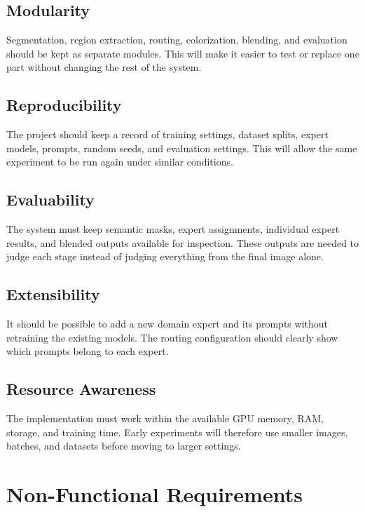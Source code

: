 \documentclass{FastFyp}
\begin{document}
\subsection{Modularity}

Segmentation, region extraction, routing, colorization, blending, and evaluation should be kept as separate modules. This will make it easier to test or replace one part without changing the rest of the system.

\subsection{Reproducibility}

The project should keep a record of training settings, dataset splits, expert models, prompts, random seeds, and evaluation settings. This will allow the same experiment to be run again under similar conditions.

\subsection{Evaluability}

The system must keep semantic masks, expert assignments, individual expert results, and blended outputs available for inspection. These outputs are needed to judge each stage instead of judging everything from the final image alone.

\subsection{Extensibility}

It should be possible to add a new domain expert and its prompts without retraining the existing models. The routing configuration should clearly show which prompts belong to each expert.

\subsection{Resource Awareness}

The implementation must work within the available GPU memory, RAM, storage, and training time. Early experiments will therefore use smaller images, batches, and datasets before moving to larger settings.

\section{Non-Functional Requirements}
\end{document}
